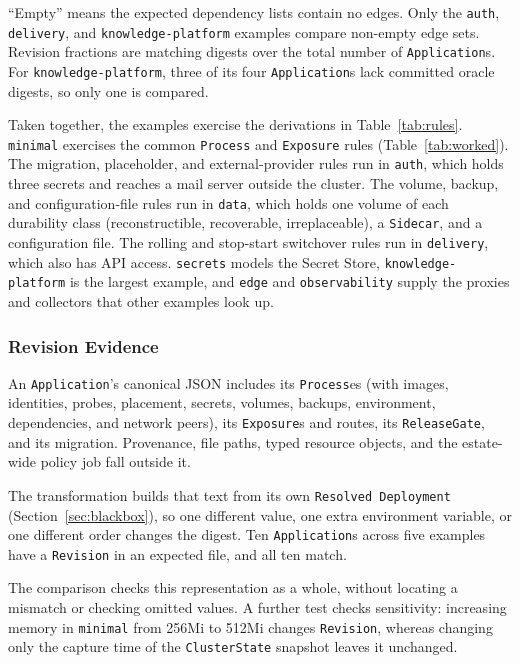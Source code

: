 ``Empty'' means the expected dependency lists contain no edges. Only the
\texttt{auth}, \texttt{delivery}, and \texttt{knowledge-\allowbreak platform} examples compare
non-empty edge sets. Revision fractions are matching digests over the total number of \texttt{Application}s. For \texttt{knowledge-platform}, three of its four \texttt{Application}s lack committed oracle digests, so only one is compared.

Taken together, the examples exercise the derivations in Table~\ref{tab:rules}.
\texttt{minimal} exercises the common \texttt{Process} and
\texttt{Exposure} rules (Table~\ref{tab:worked}). The migration, placeholder,
and external-provider rules run in \texttt{auth}, which holds three secrets
and reaches a mail server outside the cluster. The volume, backup, and
configuration-file rules run in \texttt{data}, which holds one volume of each
durability class (reconstructible, recoverable, irreplaceable), a \texttt{Sidecar}, and a
configuration file. The rolling and stop-start switchover rules run in
\texttt{delivery}, which also has API access. \texttt{secrets} models the
Secret Store, \texttt{knowledge-platform} is the largest example, and
\texttt{edge} and \texttt{observability} supply the proxies and collectors
that other examples look up.

\subsubsection{Revision Evidence}
\label{sec:revisionevidence}

An \texttt{Application}'s canonical JSON includes its \texttt{Process}es (with images, identities, probes, placement, secrets, volumes, backups, environment, dependencies, and network peers), its \texttt{Exposure}s and routes, its \texttt{ReleaseGate}, and its migration. Provenance, file paths,
typed resource objects, and the estate-wide policy job fall outside it.

The transformation builds that text from its own \texttt{Resolved Deployment}
(Section~\ref{sec:blackbox}), so one different value, one extra environment
variable, or one different order changes the digest. Ten \texttt{Application}s
across five examples have a \texttt{Revision} in an expected file, and all
ten match.

The comparison checks this representation as a whole, without locating a
mismatch or checking omitted values. A further test checks sensitivity:
increasing memory in \texttt{minimal} from 256Mi
to 512Mi changes \texttt{Revision}, whereas changing only the capture
time of the \texttt{ClusterState} snapshot leaves it unchanged.

